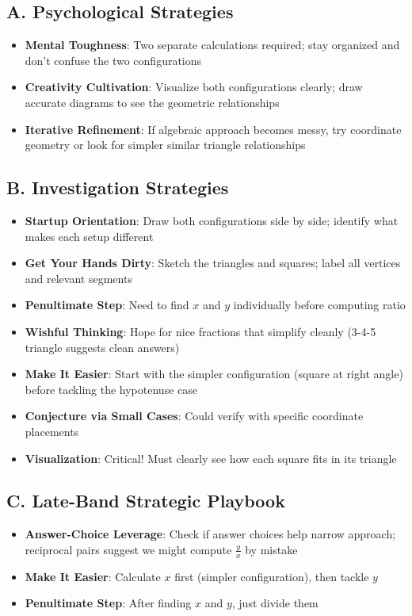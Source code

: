 \documentclass[]{article}
\begin{document}
\begin{strategicbox}
\subsection*{A. Psychological Strategies}
\begin{itemize}[leftmargin=*]
    \item \textbf{Mental Toughness}: Two separate calculations required; stay organized and don't confuse the two configurations
    \item \textbf{Creativity Cultivation}: Visualize both configurations clearly; draw accurate diagrams to see the geometric relationships
    \item \textbf{Iterative Refinement}: If algebraic approach becomes messy, try coordinate geometry or look for simpler similar triangle relationships
\end{itemize}

\subsection*{B. Investigation Strategies}
\begin{itemize}[leftmargin=*]
    \item \textbf{Startup Orientation}: Draw both configurations side by side; identify what makes each setup different
    \item \textbf{Get Your Hands Dirty}: Sketch the triangles and squares; label all vertices and relevant segments
    \item \textbf{Penultimate Step}: Need to find $x$ and $y$ individually before computing ratio
    \item \textbf{Wishful Thinking}: Hope for nice fractions that simplify cleanly (3-4-5 triangle suggests clean answers)
    \item \textbf{Make It Easier}: Start with the simpler configuration (square at right angle) before tackling the hypotenuse case
    \item \textbf{Conjecture via Small Cases}: Could verify with specific coordinate placements
    \item \textbf{Visualization}: Critical! Must clearly see how each square fits in its triangle
\end{itemize}

\subsection*{C. Late-Band Strategic Playbook}
\begin{itemize}[leftmargin=*]
    \item \textbf{Answer-Choice Leverage}: Check if answer choices help narrow approach; reciprocal pairs suggest we might compute $\frac{y}{x}$ by mistake
    \item \textbf{Make It Easier}: Calculate $x$ first (simpler configuration), then tackle $y$
    \item \textbf{Penultimate Step}: After finding $x$ and $y$, just divide them
\end{itemize}


\end{strategicbox}
\end{document}

